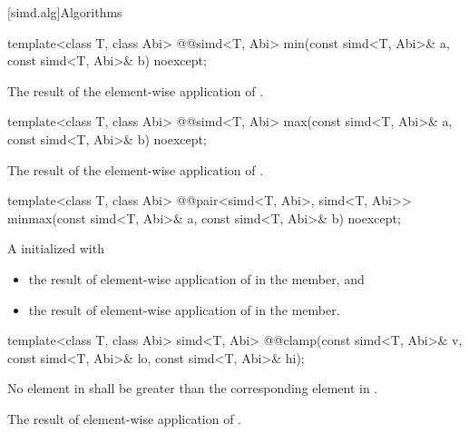 [simd.alg]{Algorithms}

\begin{itemdecl}
template<class T, class Abi> @@simd<T, Abi> min(const simd<T, Abi>& a, const simd<T, Abi>& b) noexcept;
\end{itemdecl}

\begin{itemdescr}
  \pnum\returns
  The result of the element-wise application of  \foralli.
\end{itemdescr}

\begin{itemdecl}
template<class T, class Abi> @@simd<T, Abi> max(const simd<T, Abi>& a, const simd<T, Abi>& b) noexcept;
\end{itemdecl}

\begin{itemdescr}
  \pnum\returns
  The result of the element-wise application of  \foralli.
\end{itemdescr}

\begin{itemdecl}
template<class T, class Abi>
  @@pair<simd<T, Abi>, simd<T, Abi>> minmax(const simd<T, Abi>& a, const simd<T, Abi>& b) noexcept;
\end{itemdecl}

\begin{itemdescr}
  \pnum\returns
  A  initialized with
  \begin{itemize}
    \item the result of element-wise application of  \foralli{} in the  member, and
    \item the result of element-wise application of  \foralli{} in the  member.
  \end{itemize}
\end{itemdescr}

\begin{itemdecl}
template<class T, class Abi> simd<T, Abi>
  @@clamp(const simd<T, Abi>& v, const simd<T, Abi>& lo, const simd<T, Abi>& hi);
\end{itemdecl}

\begin{itemdescr}
  \pnum\requires
  No element in  shall be greater than the corresponding element in .

  \pnum\returns
  The result of element-wise application of  \foralli.
\end{itemdescr}

